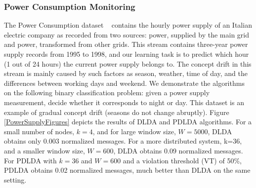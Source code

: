 \documentclass{sig-alternate-05-2015}
\begin{document}
\subsubsection{Power Consumption Monitoring}
The Power Consumption dataset ~\cite{powerSupply} contains the hourly power supply of an
Italian electric company as recorded from two sources: power, supplied
by the main grid and power, transformed from other grids.
This stream contains three-year power supply records
from 1995 to 1998, and our learning task is to predict which hour (1 out of 24 hours) the current power supply belongs to. The concept drift in this stream
is mainly caused by such factors as season, weather, time of day,
and the differences between working days and weekend.
We demonstrate the algorithms on the following binary classification problem:
given a power supply measurement, decide whether it corresponds to night or day.
This dataset is an example of gradual concept drift (seasons do not
change abruptly).
Figure \ref{PowerSupplyFigures} depicts the results of DLDA
and PDLDA algorithms. For a small number of nodes, $k=4$, and for large
window size, $W=5000$, DLDA obtains only 0.003 normalized messages.
For a more distributed system, k=36, and a smaller window
size, $W=600$, DLDA obtains 0.09 normalized messages. For PDLDA with
$k=36$ and $W=600$ and a violation threshold (VT) of 50\%, PDLDA
obtains 0.02 normalized messages, much better than DLDA on the same setting.
\end{document}
